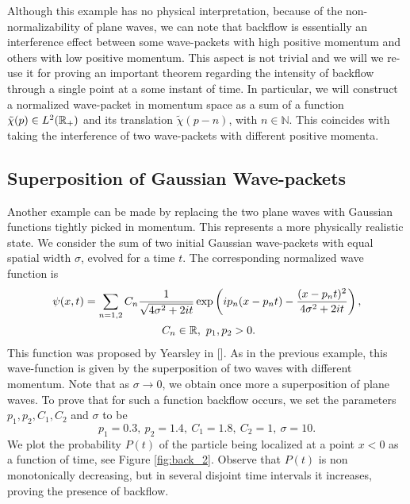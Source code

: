 Although this example has no physical interpretation, because of the non-normalizability of plane waves, we can note that backflow is essentially an interference effect between some wave-packets with high positive momentum and others with low positive momentum. This aspect is not trivial and we will we re-use it for proving an important theorem regarding the intensity of backflow through a single point at a some instant of time. In particular, we will construct a normalized wave-packet in momentum space as a sum of a function $\tilde{\chi}(p)\in L^2({\mathbb R}_+)$ and its translation $\tilde{\chi}(p-n)$, with $n\in\mathbb{N}$. This coincides with taking the interference of two wave-packets with different positive momenta.

\subsection{Superposition of Gaussian Wave-packets}
\label{sec:gaussian}
Another example can be made by replacing the two plane waves with Gaussian functions tightly picked in momentum. This represents a more physically realistic state. We consider the sum of two initial Gaussian wave-packets with equal
spatial width $\sigma$, evolved for a time $t$. The corresponding normalized wave function is
\begin{multline}
	\psi(x,t)=\sum_{n=1,2}C_n\frac{1}{\sqrt{4\sigma^2+2it}}\exp\left(ip_n(x-p_nt)-\frac{(x-p_nt)^2}{4\sigma^2+2it}\right),\\ \ C_n\in{\mathbb R},\ p_1,p_2>0.
\end{multline}
This function was proposed by Yearsley in [\citealp{years}]. As in the previous example, this wave-function is given by the superposition of two waves with different momentum. Note that as $\sigma\to0$, we obtain once more a superposition of plane waves. To prove that for such a function backflow occurs, we set the parameters $p_1,p_2,C_1,C_2$ and $\sigma$ to be
\begin{equation}
\label{eq:parameters}
p_1 = 0.3, \ p_2 = 1.4,\ C_1 = 1.8,\ C_2 = 1,\ \sigma= 10.
\end{equation}
We plot the probability $P(t)$ of the particle being localized at a point $x < 0$ as a function of time, see Figure \ref{fig:back_2}. Observe that $P(t)$ is non monotonically decreasing, but in several disjoint time intervals it increases, proving the presence of backflow.

